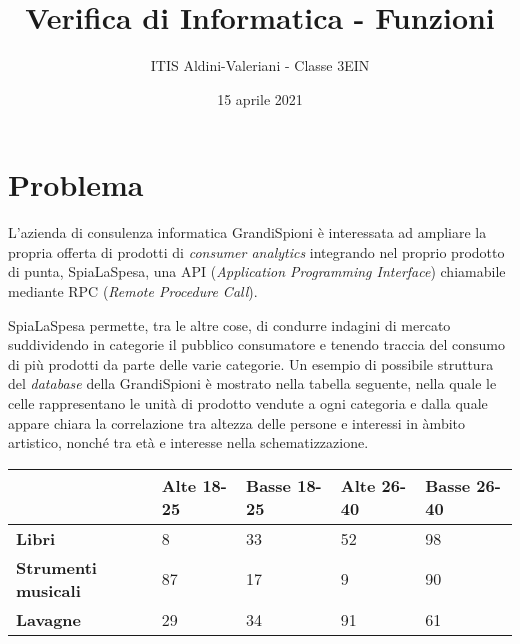 \documentclass[a4paper, 11pt]{exam}
\title{Verifica di Informatica - Funzioni}
\author{ITIS Aldini-Valeriani - Classe 3EIN}
\date{15 aprile 2021}
\begin{document}
\maketitle
\begin{center}

\end{center}
\vspace{1em}

\section*{Problema}

L'azienda di consulenza informatica GrandiSpioni è interessata ad ampliare la propria offerta di prodotti di \emph{consumer analytics} integrando nel proprio prodotto di punta, SpiaLaSpesa, una API (\emph{Application Programming Interface}) chiamabile mediante RPC (\emph{Remote Procedure Call}). 

SpiaLaSpesa permette, tra le altre cose, di condurre indagini di mercato suddividendo in categorie il pubblico consumatore e tenendo traccia del consumo di più prodotti da parte delle varie categorie. 
Un esempio di possibile struttura del \emph{database} della GrandiSpioni è mostrato nella tabella seguente, nella quale le celle rappresentano le unità di prodotto vendute a ogni categoria e dalla quale appare chiara la correlazione tra altezza delle persone e interessi in àmbito artistico, nonché tra età e interesse nella schematizzazione. 

\begin{table}[h!]

	\centering

\begin{tabular}{|l|l|l|l|l|}
\hline
                            & \textbf{Alte 18-25} & \textbf{Basse 18-25} & \textbf{Alte 26-40} & \textbf{Basse 26-40} \\ \hline
\textbf{Libri}              & 8                           & 33                           & 52                          & 98                           \\ \hline
\textbf{Strumenti musicali} & 87                          & 17                           & 9                           & 90                           \\ \hline
\textbf{Lavagne}            & 29                          & 34                           & 91                          & 61                           \\ \hline
\end{tabular}
\end{table}
\end{document}
